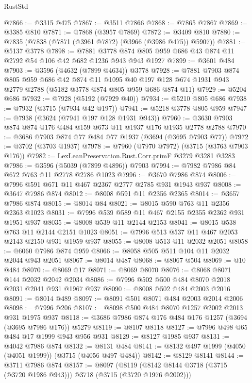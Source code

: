 \begin{lexlean}{RustStd}
\begin{coremodule}
@7866 := @3315 @475
@7867 := @3511 @7866
@7868 := @7865 @7867
@7869 := @3385 @810
@7871 := @7868 (@3957 @7869)
@7872 := @3409 @810
@7880 := @7835 (@7838 (@7871 (@3961 @7872) (@3966 (@3986 @475)) @5907))
@7881 := @5137 @3778
@7898 := @7881 @3778 @874 @805 @959 @686 @43 @874 @11 @2792 @54 @106 @42 @682 @1236 @943 @943 @1927
@7899 := @3601 @484
@7903 := @3596 (@4632 (@7899 @4634)) @3778
@7928 := @7881
    @7903
    @874
    @805
    @959
    @686
    @42
    @874
    @11
    @1095
    @40
    @197
    @128
    @674
    @1931
    @943
    @2779
    @2788
    (@5182 @3778 @874 @805 @959 @686 @874 @11)
@7929 := @5204 @686
@7932 := @7928 (@5192 (@7929 @40))
@7934 := @5210 @805 @686
@7938 := @7932 (@3715 (@7934 @42 @197))
@7941 := @5218 @3778 @805 @959
@7947 := @7938 (@3624 (@7941 @197 @128 @1931 @943))
@7960 := @3630 @7903 @874 @874 @176 @484 @159 @673 @11 @1937 @176 @1935 @2778 @2788
@7970 := @3686 @7903 @874 @77 @484 @77 @1937 (@3694 (@3695 @7903 @77))
@7972 := @3702 (@3703 @1937)
@7978 := @7960 (@7970 @7972) (@3715 (@3763 @7903 @176))
@7982 := LexLeanPreservation.Rust.Corr.primF @3279 @3281 @3283
@7986 := @3596 (@5039 (@7899 @4896)) @7903
@7994 := @7982 @7986 @84 @672 @763 @11 @2778 @2786 @1023
@7996 := @3670 @7986 @874
@8006 := @7996 @591 @671 @11 @467 @2367 @2777 @2785 @931 @1943 @937
@8008 := @3647 @7986 @874
@8012 := @8008 @591 @11 @2356 @2365
@8014 := @3657 @7986 @874
@8015 := @8014 @84
@8021 := @8015 @590 @763 @11 @2356 @2363 @1023
@8031 := @7996 @539 @589 @11 @467 @2155 @2355 @2362 @931 @1951 @937
@8035 := @8008 @539 @11 @2144 @2153
@8041 := @8015 @538 @763 @11 @2144 @2151 @1023
@8051 := @7996 @513 @537 @11 @467 @2053 @2143 @2150 @931 @1959 @937
@8055 := @8008 @513 @11 @2032 @2051
@8058 := @6060 @7986 @874 @959
@8066 := @8058 @505 @511 @104 @11 @2032 @2044 @943 @2051
@8067 := @8014 @487
@8068 := @8067 @504
@8069 := @10 @484
@8070 := @8069 @17
@8071 := @8069 @8070
@8076 := @8068 @8071 @144 @2032 @2042 @2034
@8086 := @7996 @502 @500 @484 @8070 @2018 @2031 @2041 @931 @1967 @937
@8090 := @8008 @502 @484 @2003 @2016
@8091 := @8014 @489
@8097 := @8091 @501 @8071 @484 @2003 @2014 @2006
@8098 := @7996 @206
@8107 := @8098 @500 @484 @8070 @1257 @2002 @2013 @931 @1975 @937
@8118 := @3686 @7986 @874 @176 @484 @176 @1257 (@3694 (@3695 @7986 @176)) @5279
@8119 := @8107 @8118
@8127 := @7996 @498 @65 @484 @17 @1999 @943 @956 @931
@8129 := @8127 @1985 @937
@8131 := @4042 @7986 @874
@8132 := @8131 @484
@8141 := @8132 @497 @1999 (@4050 (@4051 @1999)) (@3715 (@4056 @497 @484))
@8142 := @8129 @8141
@8144 := @3711 @7986 @874
@8157 := @8097
    (@8119 (@8142 @8144 @3718 (@3715 (@3720 @1986 @943))) @3718 (@3715 (@3720 @1976 @2002)))

\end{coremodule}
\end{lexlean}

